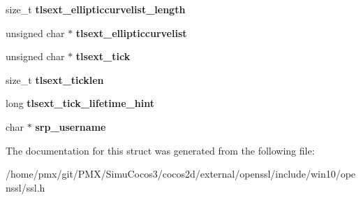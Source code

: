 \begin{DoxyCompactItemize}
size\+\_\+t {\bfseries tlsext\+\_\+ellipticcurvelist\+\_\+length}
\item 
\mbox{\label{structssl__session__st_a451da4196b8221f057c1eed1b92375ce}} 
unsigned char $\ast$ {\bfseries tlsext\+\_\+ellipticcurvelist}
\item 
\mbox{\label{structssl__session__st_a061e6eca821a577ac647c1990ad8abb4}} 
unsigned char $\ast$ {\bfseries tlsext\+\_\+tick}
\item 
\mbox{\label{structssl__session__st_a8858f901b65590fa8a077c2ef6f8aef1}} 
size\+\_\+t {\bfseries tlsext\+\_\+ticklen}
\item 
\mbox{\label{structssl__session__st_a8c4421410ed55e716ab61e143f636f24}} 
long {\bfseries tlsext\+\_\+tick\+\_\+lifetime\+\_\+hint}
\item 
\mbox{\label{structssl__session__st_a8b6d3960cbed3af15e739eade86e42c9}} 
char $\ast$ {\bfseries srp\+\_\+username}
\end{DoxyCompactItemize}


The documentation for this struct was generated from the following file\+:\begin{DoxyCompactItemize}
\item 
/home/pmx/git/\+P\+M\+X/\+Simu\+Cocos3/cocos2d/external/openssl/include/win10/openssl/ssl.\+h\end{DoxyCompactItemize}

